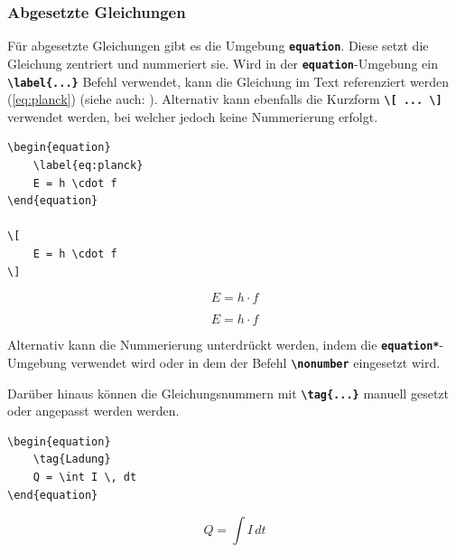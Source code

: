 \subsubsection{Abgesetzte Gleichungen}
Für abgesetzte Gleichungen gibt es die Umgebung \textbf{\texttt{equation}}. Diese setzt die Gleichung zentriert und nummeriert sie.
Wird in der \textbf{\texttt{equation}}-Umgebung ein \textbf{\texttt{\textbackslash label\{...\}}} Befehl verwendet, kann die Gleichung im Text referenziert werden (\autoref{eq:planck}) (siehe auch: ).
Alternativ kann ebenfalls die Kurzform \textbf{\texttt{\textbackslash [ ... \textbackslash ]}} verwendet werden, bei welcher jedoch keine Nummerierung erfolgt.

\begin{minipage}{0.5\textwidth}
    \begin{lstlisting}[language={[LaTeX]TeX}]
\begin{equation}
    \label{eq:planck}
    E = h \cdot f
\end{equation}

\[
    E = h \cdot f
\]

\end{lstlisting}
\end{minipage}
\hfill
\begin{minipage}{0.5\textwidth}
    \begin{equation}
        \label{eq:planck}
        E = h \cdot f
    \end{equation}

    \[
        E = h \cdot f
    \]
\end{minipage}
Alternativ kann die Nummerierung unterdrückt werden, indem die \textbf{\texttt{equation*}}-Umgebung verwendet wird oder in dem der Befehl \textbf{\texttt{\textbackslash nonumber}} eingesetzt wird.

Darüber hinaus können die Gleichungsnummern mit \textbf{\texttt{\textbackslash tag\{...\}}} manuell gesetzt oder angepasst werden werden.

\begin{minipage}{0.5\textwidth}
    \begin{lstlisting}[language={[LaTeX]TeX}]
\begin{equation}
    \tag{Ladung}
    Q = \int I \, dt
\end{equation}
\end{lstlisting}
\end{minipage}
\hfill
\begin{minipage}{0.5\textwidth}
    \begin{equation}
        \tag{Ladung}
        Q = \int I \, dt
    \end{equation}
\end{minipage}

